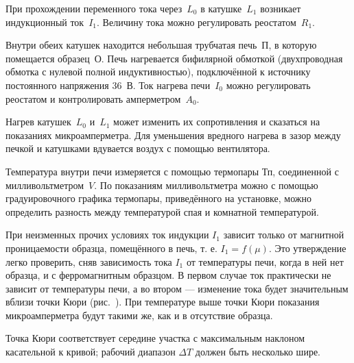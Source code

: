 При прохождении переменного тока через~$L_0$ в катушке~$L_1$ возникает
индукционный ток~$I_1$. Величину тока можно регулировать реостатом~$R_1$.

Внутри обеих катушек находится небольшая трубчатая печь~$\text{П}$, в которую
помещается образец~О. Печь нагревается бифилярной обмоткой
(двухпроводная обмотка с нулевой полной индуктивностью),
подключённой к источнику постоянного напряжения 36~В. Ток нагрева печи~$I_0$
можно регулировать реостатом и контролировать амперметром~$A_0$.

Нагрев катушек~$L_0$ и~$L_1$ может изменить их сопротивления и сказаться на
показаниях микроамперметра. Для уменьшения вредного нагрева в зазор между 
печкой и катушками вдувается воздух с помощью вентилятора.

Температура внутри печи измеряется с помощью термопары $\text{Тп}$, соединенной
с милливольтметром~$V$. По показаниям милливольтметра можно с помощью 
градуировочного графика термопары, приведённого на установке, 
можно определить разность между температурой спая и комнатной
температурой.

При неизменных прочих условиях ток индукции $I_1$ зависит только от магнитной
проницаемости образца, помещённого в печь, т. е. $I_1 = f(\mu)$. Это
утверждение легко проверить, сняв зависимость тока $I_1$ от температуры печи,
когда в ней нет образца, и с ферромагнитным образцом. В первом случае ток
практически не зависит от температуры печи, а во втором --- изменение тока будет
значительным вблизи точки Кюри (рис.~). При температуре выше точки Кюри показания микроамперметра будут
такими же, как и в отсутствие образца.

Точка Кюри соответствует середине участка с максимальным наклоном касательной к
кривой; рабочий диапазон $\Delta T$ должен быть несколько шире.

